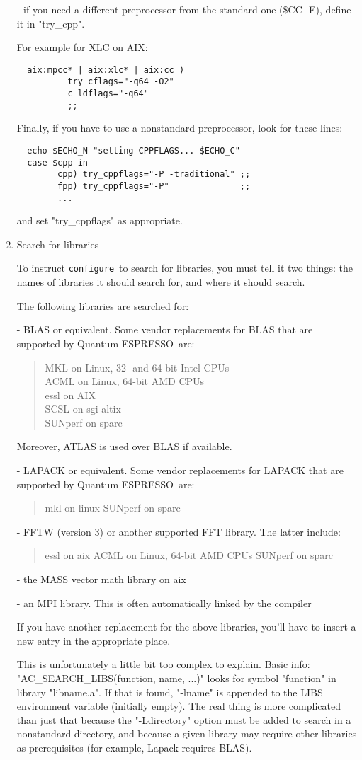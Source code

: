 \documentclass[12pt,a4paper]{article}
\def\qe{{\sc Quantum ESPRESSO}}
\def\configure{\texttt{configure}}
\begin{document}
\begin{enumerate}
- if you need a different preprocessor from the standard one (\$CC -E),
define it in "try\_cpp".

For example for XLC on AIX:
\begin{verbatim}
  aix:mpcc* | aix:xlc* | aix:cc )
          try_cflags="-q64 -O2"
          c_ldflags="-q64"
          ;;
\end{verbatim}
Finally, if you have to use a nonstandard preprocessor, look for these
lines:
\begin{verbatim}
  echo $ECHO_N "setting CPPFLAGS... $ECHO_C"
  case $cpp in
        cpp) try_cppflags="-P -traditional" ;;
        fpp) try_cppflags="-P"              ;;
        ...
\end{verbatim}
and set "try\_cppflags" as appropriate.

\item Search for libraries

To instruct \configure\ to search for libraries, you must tell it two
things: the names of libraries it should search for, and where it
should search.

The following libraries are searched for:

- BLAS or equivalent. 
Some vendor replacements for BLAS that are supported by \qe\ are:
\begin{quote}
    MKL on Linux, 32- and 64-bit Intel CPUs\\
    ACML on Linux, 64-bit AMD CPUs\\
    essl on AIX\\
    SCSL on sgi altix\\
    SUNperf on sparc
\end{quote}
Moreover, ATLAS is used over BLAS if available.

- LAPACK or equivalent. Some vendor replacements for LAPACK that are supported by \qe\ are:
\begin{quote}
    mkl on linux
    SUNperf on sparc
\end{quote}

- FFTW (version 3) or another supported FFT library. The latter include:
\begin{quote}
    essl on aix
    ACML on Linux, 64-bit AMD CPUs
    SUNperf on sparc
\end{quote}

- the MASS vector math library on aix

- an MPI library. This is often automatically linked by the compiler

If you have another replacement for the above libraries, you'll have
to insert a new entry in the appropriate place.

This is unfortunately a little bit too complex to explain.
Basic info: \\
"AC\_SEARCH\_LIBS(function, name, ...)" looks for symbol
"function" in library "libname.a".  If that is found, "-lname" is
appended to the LIBS environment variable (initially empty).
The real thing is more complicated than just that because the
"-Ldirectory" option must be added to search in a nonstandard
directory, and because a given library may require other libraries as
prerequisites (for example, Lapack requires BLAS).
\end{enumerate}
\end{document}
